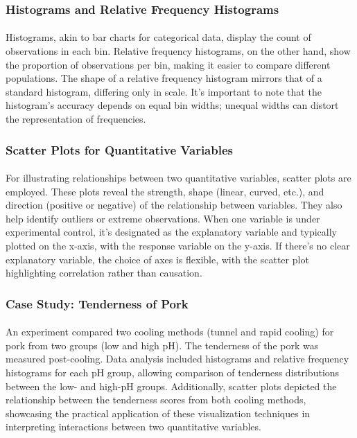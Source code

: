 \documentclass{article}
\begin{document}
\subsubsection*{Histograms and Relative Frequency Histograms}
\paragraph{}
Histograms, akin to bar charts for categorical data, display the count of observations in each bin. Relative frequency histograms, on the other hand, show the proportion of observations per bin, making it easier to compare different populations. The shape of a relative frequency histogram mirrors that of a standard histogram, differing only in scale. It's important to note that the histogram's accuracy depends on equal bin widths; unequal widths can distort the representation of frequencies.

\subsubsection*{Scatter Plots for Quantitative Variables}
\paragraph{}
For illustrating relationships between two quantitative variables, scatter plots are employed. These plots reveal the strength, shape (linear, curved, etc.), and direction (positive or negative) of the relationship between variables. They also help identify outliers or extreme observations. When one variable is under experimental control, it's designated as the explanatory variable and typically plotted on the x-axis, with the response variable on the y-axis. If there's no clear explanatory variable, the choice of axes is flexible, with the scatter plot highlighting correlation rather than causation.

\subsubsection*{Case Study: Tenderness of Pork}
\paragraph{}
An experiment compared two cooling methods (tunnel and rapid cooling) for pork from two groups (low and high pH). The tenderness of the pork was measured post-cooling. Data analysis included histograms and relative frequency histograms for each pH group, allowing comparison of tenderness distributions between the low- and high-pH groups. Additionally, scatter plots depicted the relationship between the tenderness scores from both cooling methods, showcasing the practical application of these visualization techniques in interpreting interactions between two quantitative variables.
\end{document}

